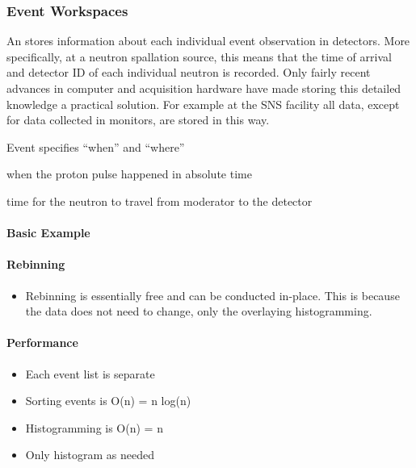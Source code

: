 \documentclass[letterpaper,10pt,english,openany]{sphinxmanual}
\let\sphinxpxdimen\pdfpxdimen\else\newdimen\sphinxpxdimen
\begin{document}
\subsubsection{Event Workspaces}
\label{\detokenize{mantid_basic_course/algorithms_workspaces_and_histories/03_workspaces:event-workspaces}}
An  stores information about each
individual event observation in detectors. More specifically, at a
neutron spallation source, this means that the time of arrival and
detector ID of each individual neutron is recorded. Only fairly recent
advances in computer and acquisition hardware have made storing this
detailed knowledge a practical solution. For example at the SNS facility
all data, except for data collected in monitors, are stored in this way.

Event specifies “when” and “where”

 \textendash{} when the proton pulse happened in absolute time

 \textendash{} time for the neutron to travel from moderator to
the detector


\paragraph{Basic Example}
\label{\detokenize{mantid_basic_course/algorithms_workspaces_and_histories/03_workspaces:basic-example}}
\begin{figure}[H]
\centering

\noindent\sphinxincludegraphics[width=500\sphinxpxdimen]{{Binning_example}.png}
\end{figure}


\paragraph{Rebinning}
\label{\detokenize{mantid_basic_course/algorithms_workspaces_and_histories/03_workspaces:rebinning}}\begin{itemize}
\item {} 
Rebinning is essentially free and can be conducted in-place. This is
because the data does not need to change, only the overlaying
histogramming.

\end{itemize}


\paragraph{Performance}
\label{\detokenize{mantid_basic_course/algorithms_workspaces_and_histories/03_workspaces:performance}}\begin{itemize}
\item {} 
Each event list is separate

\item {} 
Sorting events is O(n) = n log(n)

\item {} 
Histogramming is O(n) = n

\item {} 
Only histogram as needed

\end{itemize}
\end{document}

